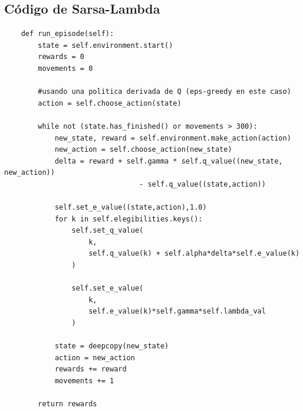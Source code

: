 \documentclass[11pt, a4paper]{article}
\begin{document}
\subsection{Código de Sarsa-Lambda}
\begin{verbatim}
    def run_episode(self):
        state = self.environment.start()
        rewards = 0
        movements = 0
        
        #usando una politica derivada de Q (eps-greedy en este caso)
        action = self.choose_action(state)
                
        while not (state.has_finished() or movements > 300):
            new_state, reward = self.environment.make_action(action)
            new_action = self.choose_action(new_state)
            delta = reward + self.gamma * self.q_value((new_state, new_action)) 
                                - self.q_value((state,action))
            
            self.set_e_value((state,action),1.0)
            for k in self.elegibilities.keys():
                self.set_q_value(
                    k, 
                    self.q_value(k) + self.alpha*delta*self.e_value(k)
                )
                
                self.set_e_value(
                    k, 
                    self.e_value(k)*self.gamma*self.lambda_val
                )

            state = deepcopy(new_state)
            action = new_action
            rewards += reward
            movements += 1
        
        return rewards
\end{verbatim}
\end{document}
